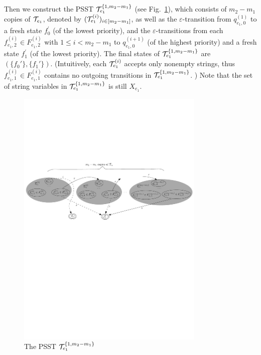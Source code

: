 Then we construct the PSST $\mathcal{T}^{\{1,m_2-m_1\}}_{e_1}$ (see Fig.~\ref{fig-reg2pfa-4}), which consists of $m_2-m_1$ copies of $\mathcal{T}_{e_1}$, denoted by $(\mathcal{T}^{(i)}_{e_1})_{i \in [m_2-m_1]}$, as well as the $\varepsilon$-transition from $q^{(1)}_{e_1,0}$ to a fresh state $f^\prime_0$ (of the lowest priority), and the $\varepsilon$-transitions from each $f^{(i)}_{e_1,2} \in F^{(i)}_{e_1,2}$ with $1\le i < m_2-m_1$ to $q^{(i+1)}_{e_1,0}$ (of the highest priority) and a fresh state $f^\prime_1$ (of the lowest priority). The final states of $\mathcal{T}^{\{1,m_2-m_1\}}_{e_1}$ are $(\{f_0'\},\{f_1'\})$. (Intuitively, each $\mathcal{T}^{(i)}_{e_1}$ accepts only nonempty strings, thus $f^{(i)}_{e_1,1} \in F^{(i)}_{e_1,1}$ contains no outgoing transitions in $\mathcal{T}^{\{1,m_2-m_1\}}_{e_1}$. ) Note that the set of string variables in $\mathcal{T}^{\{1,m_2-m_1\}}_{e_1}$ is still $X_{e_1}$.
%
\begin{figure}[tb]
	\centering
	\includegraphics[width = 0.8\textwidth]{reg2pfa-4.pdf}
	\caption{The PSST $\mathcal{T}^{\{1,m_2-m_1\}}_{e_1}$}
	\label{fig-reg2pfa-4}
\end{figure}  


